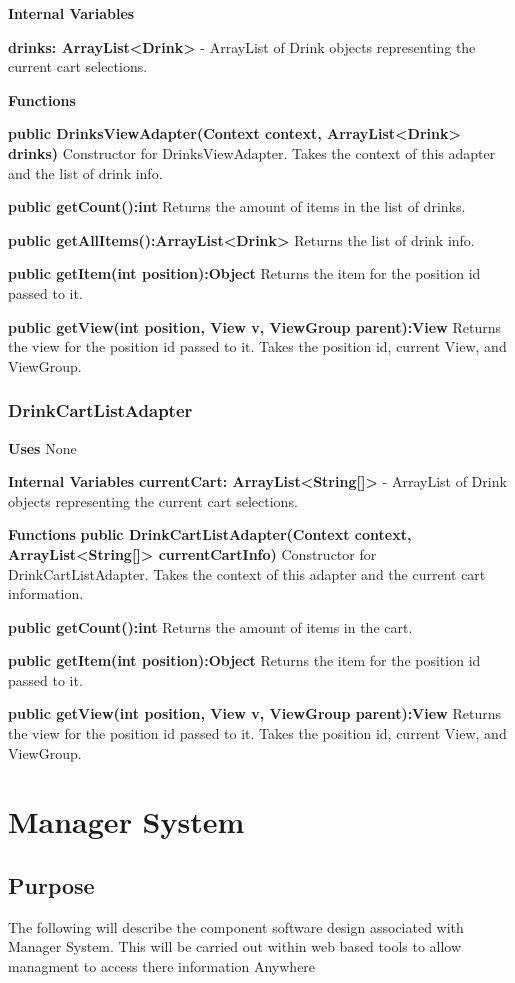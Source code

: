 \documentclass [10pt]{article}
\begin{document}
\textbf{Internal Variables}

\textbf{drinks: ArrayList<Drink>} - ArrayList of Drink objects representing the current cart selections.

\textbf{Functions}

\textbf{public DrinksViewAdapter(Context context, ArrayList<Drink> drinks)}
Constructor for DrinksViewAdapter. Takes the context of this adapter and the list of drink info.

\textbf{public getCount():int}
Returns the amount of items in the list of drinks.

\textbf{public getAllItems():ArrayList<Drink>}
Returns the list of drink info.

\textbf{public getItem(int position):Object}
Returns the item for the position id passed to it.

\textbf{public getView(int position, View v, ViewGroup parent):View}
Returns the view for the position id passed to it. Takes the position id, current View, and ViewGroup.

\subsubsection{DrinkCartListAdapter}

\textbf{Uses} None

\textbf{Internal Variables}
\textbf{currentCart: ArrayList<String[]>} - ArrayList of Drink objects representing the current cart selections.

\textbf{Functions}
\textbf{public DrinkCartListAdapter(Context context, ArrayList<String[]> currentCartInfo)}
Constructor for DrinkCartListAdapter. Takes the context of this adapter and the current cart information.

\textbf{public getCount():int}
Returns the amount of items in the cart.

\textbf{public getItem(int position):Object}
Returns the item for the position id passed to it.

\textbf{public getView(int position, View v, ViewGroup parent):View}
Returns the view for the position id passed to it. Takes the position id, current View, and ViewGroup.


\section {Manager System}


\subsection{Purpose}
The following will describe the component software design associated with Manager System. This will be carried out within web based tools to allow managment to access there information Anywhere
\end{document}
